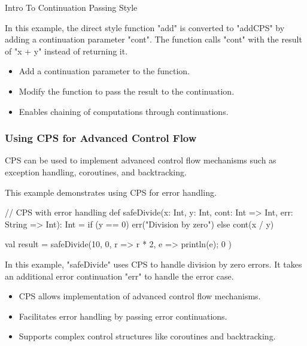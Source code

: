 \begin{notes}{Intro To Continuation Passing Style}
\begin{highlight}
        In this example, the direct style function "add" is converted to "addCPS" by adding a continuation parameter "cont". The function calls "cont" with the result of "x + y" instead of returning it.
    
        \begin{itemize}
            \item Add a continuation parameter to the function.
            \item Modify the function to pass the result to the continuation.
            \item Enables chaining of computations through continuations.
        \end{itemize}
    
    \end{highlight}
    
    \subsubsection*{Using CPS for Advanced Control Flow}
    
    CPS can be used to implement advanced control flow mechanisms such as exception handling, coroutines, and backtracking.
    
    \begin{highlight}
    
        This example demonstrates using CPS for error handling.
    
    \begin{code}[Scala]
    // CPS with error handling
    def safeDivide(x: Int, y: Int, cont: Int => Int, err: String => Int): Int =
        if (y == 0) err("Division by zero") else cont(x / y)
    
    val result = safeDivide(10, 0, r => r * 2, e => { println(e); 0 })
    \end{code}
    
        In this example, "safeDivide" uses CPS to handle division by zero errors. It takes an additional error continuation "err" to handle the error case.
    
        \begin{itemize}
            \item CPS allows implementation of advanced control flow mechanisms.
            \item Facilitates error handling by passing error continuations.
            \item Supports complex control structures like coroutines and backtracking.
        \end{itemize}
    

\end{highlight}
\end{notes}
